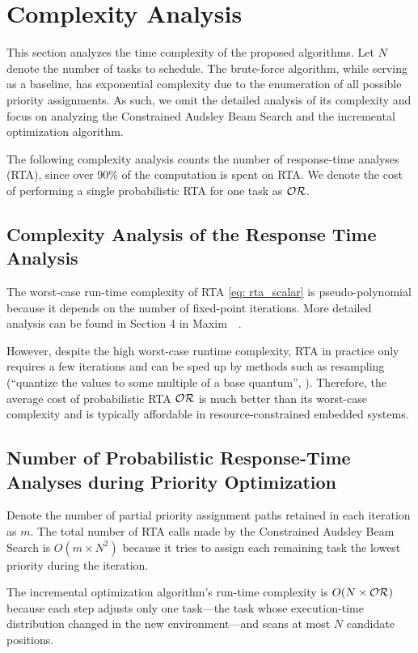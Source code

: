 
    \section{Complexity Analysis}
	\label{section_complexity_analysis}


This section analyzes the time complexity of the proposed algorithms. Let $N$ denote the number of tasks to schedule. The brute-force algorithm, while serving as a baseline, has exponential complexity due to the enumeration of all possible priority assignments. As such, we omit the detailed analysis of its complexity and focus on analyzing the Constrained Audsley Beam Search and the incremental optimization algorithm.


The following complexity analysis counts the number of response-time analyses (RTA), since over 90\% of the computation is spent on RTA.
We denote the cost of performing a single probabilistic RTA for one task as $\mathcal{OR}{}$.
    

\subsection{Complexity Analysis of the Response Time Analysis}
    The worst-case run-time complexity of RTA \eqref{eq: rta_scalar} is pseudo-polynomial because it depends on the number of fixed-point iterations. 
    More detailed analysis can be found in Section 4 in Maxim~\etal~\cite{Maxim2022ProbabilisticA}.
    
    However, despite the high worst-case runtime complexity, RTA in practice only requires a few iterations and can be sped up by methods such as resampling (``quantize the values to some multiple of a base quantum'', \cite{Maxim2022ProbabilisticA}).
    Therefore, the average cost of probabilistic RTA $\mathcal{OR}{}$ is much better than its worst-case complexity and is typically affordable in resource-constrained embedded systems.

\subsection{Number of Probabilistic Response-Time Analyses during Priority Optimization}
Denote the number of partial priority assignment paths retained in each iteration as $m$. The total number of RTA calls made by the Constrained Audsley Beam Search is $O(m \times N^2)$ because it tries to assign each remaining task the  lowest priority during the  iteration.

The incremental optimization algorithm's run-time complexity is $O(N \times \mathcal{OR}{})$ because each step adjusts only one task---the task whose execution-time distribution changed in the new environment---and scans at most $N$ candidate positions.

